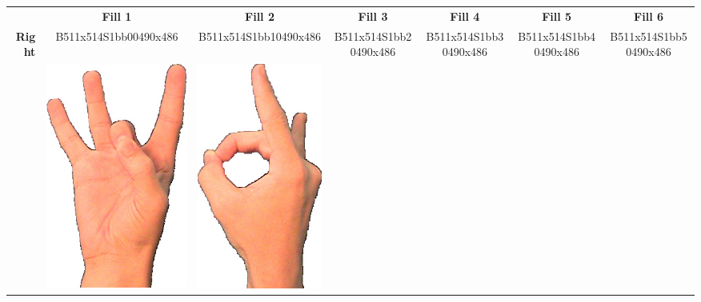 \documentclass{article}
\begin{document}
\begin{center}
\begin{tabular}{r*{6}{c}}
&\textbf{Fill 1}&\textbf{Fill 2}&\textbf{Fill 3}&\textbf{Fill 4}&\textbf{Fill 5}&\textbf{Fill 6}\\
\multirow{2}{*}{\textbf{Right}}&
B511x514S1bb00490x486&
B511x514S1bb10490x486&
B511x514S1bb20490x486&
B511x514S1bb30490x486&
B511x514S1bb40490x486&
B511x514S1bb50490x486\\
&
\includegraphics[scale=0.1]{images/08-01-1.jpg}&
\includegraphics[scale=0.1]{images/08-01-2.jpg}&

\end{tabular}
\end{center}
\end{document}
